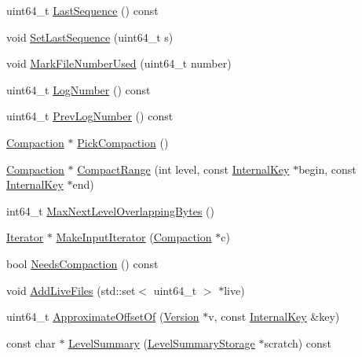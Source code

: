 \begin{DoxyCompactItemize}
\item 
uint64\+\_\+t \mbox{\hyperlink{classleveldb_1_1_version_set_a265fa1089536e2b66cc3cc52a2a5bc1e}{Last\+Sequence}} () const
\item 
void \mbox{\hyperlink{classleveldb_1_1_version_set_a2234860e72a1ac7361d7bee107da6a07}{Set\+Last\+Sequence}} (uint64\+\_\+t s)
\item 
void \mbox{\hyperlink{classleveldb_1_1_version_set_a8a009a58938b12c7a69bda2b4da115a0}{Mark\+File\+Number\+Used}} (uint64\+\_\+t number)
\item 
uint64\+\_\+t \mbox{\hyperlink{classleveldb_1_1_version_set_a78960eb465191babdd19ed75bc3ea91b}{Log\+Number}} () const
\item 
uint64\+\_\+t \mbox{\hyperlink{classleveldb_1_1_version_set_aa0130ef9785e68ccc85506a79cb433be}{Prev\+Log\+Number}} () const
\item 
\mbox{\hyperlink{classleveldb_1_1_compaction}{Compaction}} $\ast$ \mbox{\hyperlink{classleveldb_1_1_version_set_a1cdc6a05e0a7df9f29b5bccd485a0219}{Pick\+Compaction}} ()
\item 
\mbox{\hyperlink{classleveldb_1_1_compaction}{Compaction}} $\ast$ \mbox{\hyperlink{classleveldb_1_1_version_set_a3a03f9a6c86e861be314cf8e01f33142}{Compact\+Range}} (int level, const \mbox{\hyperlink{classleveldb_1_1_internal_key}{Internal\+Key}} $\ast$begin, const \mbox{\hyperlink{classleveldb_1_1_internal_key}{Internal\+Key}} $\ast$end)
\item 
int64\+\_\+t \mbox{\hyperlink{classleveldb_1_1_version_set_a32dc1a7e1eaeeeac89286be3483ad612}{Max\+Next\+Level\+Overlapping\+Bytes}} ()
\item 
\mbox{\hyperlink{classleveldb_1_1_iterator}{Iterator}} $\ast$ \mbox{\hyperlink{classleveldb_1_1_version_set_a181194e96a88e69a60c1fda9cf3c4651}{Make\+Input\+Iterator}} (\mbox{\hyperlink{classleveldb_1_1_compaction}{Compaction}} $\ast$c)
\item 
bool \mbox{\hyperlink{classleveldb_1_1_version_set_a5a8a8a80e14a141672c7fdc9c7dd7328}{Needs\+Compaction}} () const
\item 
void \mbox{\hyperlink{classleveldb_1_1_version_set_a3b3c810f0fea88db81b94e604b3dd78f}{Add\+Live\+Files}} (std\+::set$<$ uint64\+\_\+t $>$ $\ast$live)
\item 
uint64\+\_\+t \mbox{\hyperlink{classleveldb_1_1_version_set_ada7f3ed63b1c48adb6e5b38348b300e1}{Approximate\+Offset\+Of}} (\mbox{\hyperlink{classleveldb_1_1_version}{Version}} $\ast$v, const \mbox{\hyperlink{classleveldb_1_1_internal_key}{Internal\+Key}} \&key)
\item 
const char $\ast$ \mbox{\hyperlink{classleveldb_1_1_version_set_a1c49a6a2f6c6346d19d57ade22e04ee2}{Level\+Summary}} (\mbox{\hyperlink{structleveldb_1_1_version_set_1_1_level_summary_storage}{Level\+Summary\+Storage}} $\ast$scratch) const
\end{DoxyCompactItemize}
